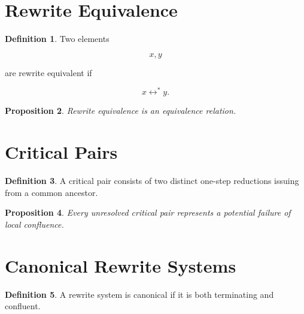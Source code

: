 \documentclass[11pt]{book}
\numberwithin{equation}{chapter}
\theoremstyle{definition}
\newtheorem{definition}{Definition}[chapter]
\theoremstyle{plain}
\newtheorem{proposition}[definition]{Proposition}
\begin{document}
\section{Rewrite Equivalence}

\begin{definition}

Two elements

\[
x,
y
\]

are rewrite equivalent if

\[
x
\leftrightarrow^{*}
y.
\]

\end{definition}


\begin{proposition}

Rewrite equivalence is an equivalence relation.

\end{proposition}


\section{Critical Pairs}

\begin{definition}

A critical pair consists of two distinct one-step reductions issuing
from a common ancestor.

\end{definition}


\begin{proposition}

Every unresolved critical pair represents a potential failure of local
confluence.

\end{proposition}


\section{Canonical Rewrite Systems}

\begin{definition}

A rewrite system is canonical if it is both terminating and confluent.

\end{definition}
\end{document}
